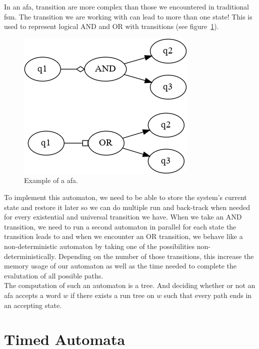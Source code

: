 \documentclass[12pt]{article}
\theoremstyle{definition}
\theoremstyle{definition}
\theoremstyle{remark}
\begin{document}
In an \gls{afa}, transition are more complex than those we encountered in traditional \gls{fsm}. The transition we are working with can lead to more than one state! This is used to represent logical AND and OR with transitions (see figure~\ref{afa}).\\

\begin{figure}
    \centering
    \includegraphics[scale=0.8]{graph/afa.png}
    \caption{Example of a \gls{afa}.}
    \label{afa}
\end{figure}

To implement this automaton, we need to be able to store the system's current state and restore it later so we can do multiple run and back-track when needed for every existential and universal transition we have. When we take an AND transition, we need to run a second automaton in parallel for each state the transition leads to and when we encounter an OR transition, we behave like a non-deterministic automaton by taking one of the possibilities non-deterministically. Depending on the number of those transitions, this increase the memory usage of our automaton as well as the time needed to complete the evalutation of all possible paths.\\

The computation of such an automaton is a tree. And deciding whether or not an \gls{afa} accepts a word $w$ if there exists a run tree on $w$ such that every path ends in an accepting state.~\cite{AFA:2017}\\



\section{Timed Automata}
\end{document}
